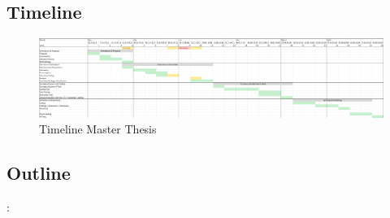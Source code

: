 
\subsection{Timeline}
\begin{figure}[th]
    \centering
    \includegraphics{Figures/SottmannBosse_timeline.png}
    \caption[Timeline Master Thesis]{Timeline Master Thesis}
    \label{fig:timeline}
    \end{figure}
    
\subsection{Outline}:

